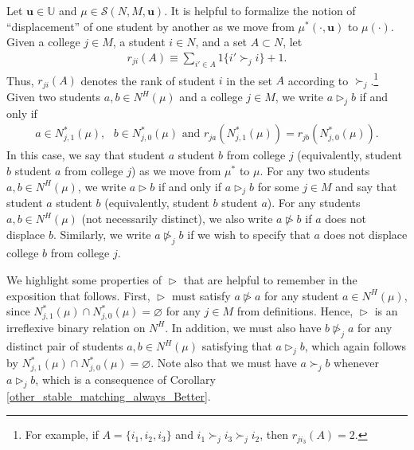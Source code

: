 \documentclass[12pt, fullpage]{amsart}
\theoremstyle{definition}
\theoremstyle{definition}
\theoremstyle{definition}
\begin{document}
\begin{bibunit}[econometrica]
Let $\boldsymbol{u}\in \mathbb{U}$ and $\mu \in \mathcal{S}(N,M,\boldsymbol{u})$. It is helpful to formalize the notion of ``displacement'' of one student by another as we move from $\mu^{*}(\cdot, \boldsymbol{u})$ to $\mu(\cdot)$. Given a college $j\in M$, a student $i\in N$, and a set $A\subset N$, let
\begin{align}
r_{ji}(A)\equiv\sum_{i' \in A}1\{i'\succ_{j} i\}+1.
\end{align}
Thus, $r_{ji}(A)$ denotes the rank of student $i$ in the set $A$ according to $\succ_{j}$.\footnote{For example, if $A=\{i_{1},i_{2},i_{3}\}$ and $i_{1}\succ_{j}i_{3}\succ_{j}i_{2}$, then $ r_{ji_{3}}(A)=2$.}  Given two students $a,b\in N^{H}(\mu) $ and a college $j\in M$, we write $a\vartriangleright_{j}b$ if and only if 
\begin{align}
a\in N^{*}_{j,1}(\mu),\text{ } b\in  N^{*}_{j,0}(\mu) \text { and }r_{ja}(N^{*}_{j,1}(\mu))=r_{jb}(N^{*}_{j,0}(\mu)).
\end{align}
In this case, we say that student $a$  student $b$ from college $j$ (equivalently, student $b$  student $a$ from college $j$) as we move from $\mu^{*}$ to $\mu$.  For any two students $a,b\in N^{H}(\mu) $, we write $a\vartriangleright b$  if and only if $a\vartriangleright_{j}b$ for some $j\in M$ and say that student $a$  student $b$ (equivalently, student $b$  student $a$). For any students $a,b\in N^{H}(\mu) $ (not necessarily distinct), we also write $a\ntriangleright b$ if $a$ does not displace $b$. Similarly, we write $a\ntriangleright_{j} b$ if we wish to specify that $a$ does not displace college $b$ from college $j$.


We highlight some properties of $\vartriangleright$ that are helpful to remember in the exposition that follows. First, $\vartriangleright$ must satisfy $a\ntriangleright a$ for any student $a\in N^{H}(\mu) $, since $N^{*}_{j,1}(\mu) \cap N^{*}_{j,0}(\mu) =\varnothing$ for any $j\in M$ from definitions.   Hence, $\vartriangleright$ is an irreflexive binary relation on $N^{H}$. In addition, we must also have  $b\ntriangleright_{j} a$ for any distinct pair of students $a,b\in N^{H}(\mu)$ satisfying that $a\vartriangleright_{j} b$, which again follows by $N^{*}_{j,1}(\mu) \cap N^{*}_{j,0}(\mu) =\varnothing$. Note also that we must have $a\succ_{j}b$ whenever  $a\vartriangleright_{j} b$, which is a consequence of Corollary \ref{other_stable_matching_always_Better}.

\medskip


\end{bibunit}
\end{document}
